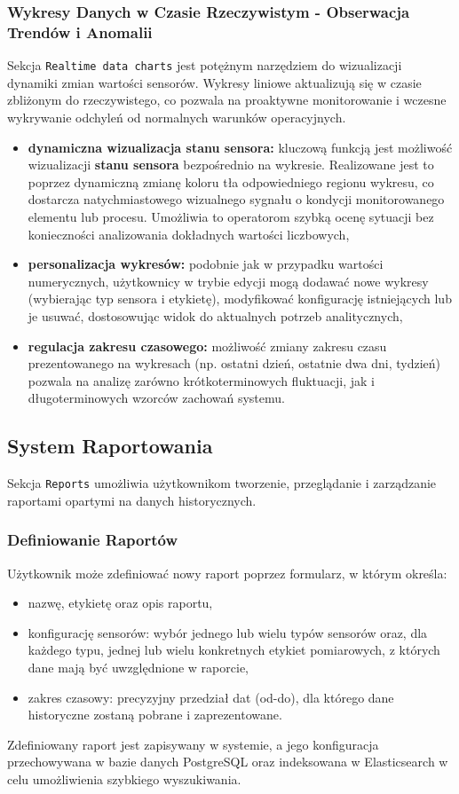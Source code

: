 \subsubsection{Wykresy Danych w Czasie Rzeczywistym - Obserwacja Trendów i Anomalii}
Sekcja \texttt{Realtime data charts} jest potężnym narzędziem do wizualizacji dynamiki zmian wartości sensorów. Wykresy liniowe aktualizują się w czasie zbliżonym do rzeczywistego, co pozwala na proaktywne monitorowanie i wczesne wykrywanie odchyleń od normalnych warunków operacyjnych.
\begin{itemize}
    \item \textbf{dynamiczna wizualizacja stanu sensora:} kluczową funkcją jest możliwość wizualizacji \textbf{stanu sensora} bezpośrednio na wykresie. Realizowane jest to poprzez dynamiczną zmianę koloru tła odpowiedniego regionu wykresu, co dostarcza natychmiastowego wizualnego sygnału o kondycji monitorowanego elementu lub procesu. Umożliwia to operatorom szybką ocenę sytuacji bez konieczności analizowania dokładnych wartości liczbowych,
    \item \textbf{personalizacja wykresów:} podobnie jak w przypadku wartości numerycznych, użytkownicy w trybie edycji mogą dodawać nowe wykresy (wybierając typ sensora i etykietę), modyfikować konfigurację istniejących lub je usuwać, dostosowując widok do aktualnych potrzeb analitycznych,
    \item \textbf{regulacja zakresu czasowego:} możliwość zmiany zakresu czasu prezentowanego na wykresach (np. ostatni dzień, ostatnie dwa dni, tydzień) pozwala na analizę zarówno krótkoterminowych fluktuacji, jak i długoterminowych wzorców zachowań systemu.
\end{itemize}
\subsection{System Raportowania}
Sekcja \texttt{Reports} umożliwia użytkownikom tworzenie, przeglądanie i zarządzanie raportami opartymi na danych historycznych.

\subsubsection{Definiowanie Raportów}
Użytkownik może zdefiniować nowy raport poprzez formularz, w którym określa:
\begin{itemize}
    \item nazwę, etykietę oraz opis raportu,
    \item konfigurację sensorów: wybór jednego lub wielu typów sensorów oraz, dla każdego typu, jednej lub wielu konkretnych etykiet pomiarowych, z których dane mają być uwzględnione w raporcie,
    \item zakres czasowy: precyzyjny przedział dat (od-do), dla którego dane historyczne zostaną pobrane i zaprezentowane.
\end{itemize}
Zdefiniowany raport jest zapisywany w systemie, a jego konfiguracja przechowywana w bazie danych PostgreSQL oraz indeksowana w Elasticsearch w celu umożliwienia szybkiego wyszukiwania.

